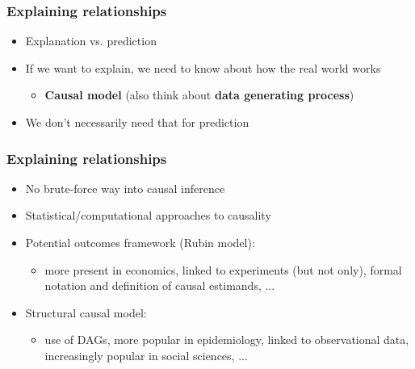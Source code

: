 \documentclass[aspectratio=43]{beamer}
\begin{document}
%
%
%

\begin{frame}
\frametitle{Explaining relationships}
\centering

\begin{itemize}
  \item Explanation vs. prediction
  \item<2-> If we want to explain, we need to know about how the real world works
  \begin{itemize}
    \item \textbf{Causal model} (also think about \textbf{data generating process})
  \end{itemize}
  \item<3-> We don't necessarily need that for prediction
\end{itemize}

\end{frame}

\begin{frame}
\frametitle{Explaining relationships}
\centering

\begin{itemize}
  \item No brute-force way into causal inference
  \item Statistical/computational approaches to causality
  \item<1->[1.] Potential outcomes framework (Rubin model):
  \begin{itemize}
    \item more present in economics, linked to experiments (but not only), formal notation and definition of causal estimands, ...
  \end{itemize}
  \item<2->[2.] Structural causal model:
  \begin{itemize}
    \item use of DAGs, more popular in epidemiology, linked to observational data, increasingly popular in social sciences, ...
  \end{itemize}
\end{itemize}

\end{frame}
\end{document}
